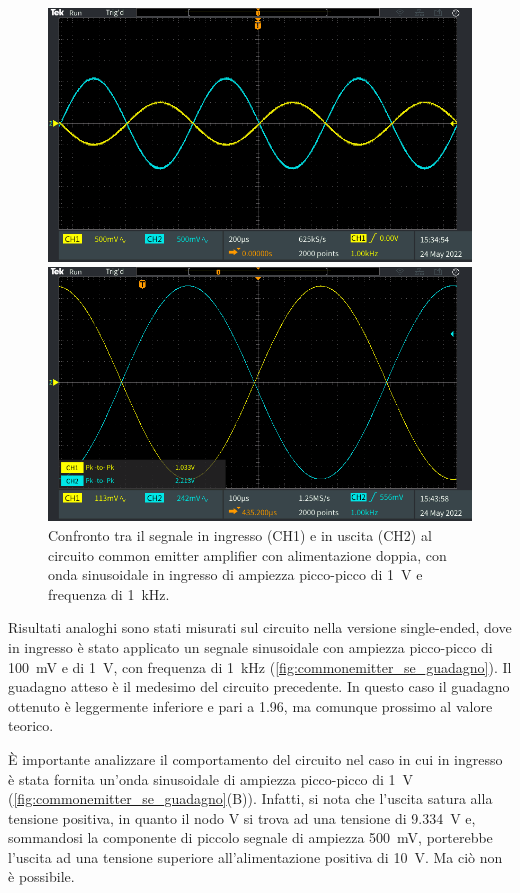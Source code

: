 \begin{figure}[h!]
	\centering
	\includegraphics[width=0.7\linewidth]{./ImageFiles/Laboratorio 3/TEK00006}
	\vspace{1cm}
	
	\includegraphics[width=0.7\linewidth]{./ImageFiles/Laboratorio 3/TEK00007}
	\caption{Confronto tra il segnale in ingresso (CH1) e in uscita (CH2) al circuito common emitter amplifier con alimentazione doppia, con onda sinusoidale in ingresso di ampiezza picco-picco di \SI{1}{\volt} e frequenza di \SI{1}{\kilo\hertz}.}
	\label{fig:commonemitter_guadagno}
\end{figure}

Risultati analoghi sono stati misurati sul circuito nella versione single-ended, dove in ingresso è stato applicato un segnale sinusoidale con ampiezza picco-picco di \SI{100}{\milli\volt} e di \SI{1}{\volt}, con frequenza di \SI{1}{\kilo\hertz} (\Fig\ref{fig:commonemitter_se_guadagno}). Il guadagno atteso è il medesimo del circuito precedente. In questo caso il guadagno ottenuto è leggermente inferiore e pari a 1.96, ma comunque prossimo al valore teorico.

\`E importante analizzare il comportamento del circuito nel caso in cui in ingresso è stata fornita un'onda sinusoidale di ampiezza picco-picco di \SI{1}{\volt} (\Fig\ref{fig:commonemitter_se_guadagno}(B)). Infatti, si nota che l'uscita satura alla tensione positiva, in quanto il nodo V si trova ad una tensione di \SI{9.334}{\volt} e, sommandosi la componente di piccolo segnale di ampiezza \SI{500}{\milli\volt}, porterebbe l'uscita ad una tensione superiore all'alimentazione positiva di \SI{10}{\volt}. Ma ciò non è possibile. 

